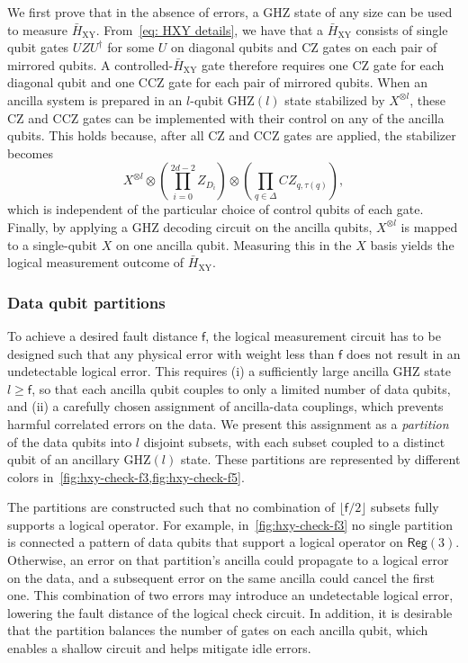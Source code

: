 \documentclass[%
    aps, 
    physrev,
    reprint,
]{revtex4-2}
\newcommand{\reg}[1]{\mathsf{Reg}(#1)}
\newcommand{\GHZ}[1]{\text{GHZ}(#1)}
\newcommand{\XY}{_\mathrm{XY}}
\newcommand{\dg}{^\dagger}
\begin{document}
We first prove that in the absence of errors, a GHZ state of any size can be used to measure $\bar{H}\XY$. 
From~\cref{eq: HXY details}, we have that a $\bar{H}\XY$ consists of single qubit gates $UZU\dg$ for some $U$ on diagonal qubits and CZ gates on each pair of mirrored qubits. 
A controlled-$\bar{H}\XY$ gate therefore requires one CZ gate for each diagonal qubit and one CCZ gate for each pair of mirrored qubits. When an ancilla system is prepared in an $l$-qubit  $\GHZ{l}$ state stabilized by $X^{\otimes l}$, these CZ and CCZ gates can be implemented with their control on any of the ancilla qubits. This holds because, after all CZ and CCZ gates are applied, the stabilizer becomes 
\begin{equation}
    X^{\otimes l} \otimes \left(\prod_{i=0}^{2d-2}Z_{D_i}\right) \otimes \left( \prod_{q\in\Delta}CZ_{q, \tau(q)} \right),
\end{equation}
which is independent of the particular choice of control qubits of each gate. Finally, by applying a GHZ decoding circuit on the ancilla qubits, $X^{\otimes l}$ is mapped to a single-qubit $X$ on one ancilla qubit. Measuring this in the $X$ basis yields the logical measurement outcome of $\bar{H}\XY$.

\subsubsection{Data qubit partitions}

To achieve a desired fault distance $\mathsf{f}$, the logical measurement circuit has to be designed such that any physical error with weight less than $\mathsf{f}$ does not result in an undetectable logical error. 
This requires (i) a sufficiently large ancilla GHZ state $l \geq \mathsf{f}$, so that each ancilla qubit couples to only a limited number of data qubits, and (ii) a carefully chosen assignment of ancilla-data couplings, which prevents harmful correlated errors on the data. 
We present this assignment as a \textit{partition} of the data qubits into $l$ disjoint subsets, with each subset coupled to a distinct qubit of an ancillary $\GHZ{l}$ state. 
These partitions are represented by different colors in~\cref{fig:hxy-check-f3,fig:hxy-check-f5}. 

The partitions are constructed such that no combination of $\lfloor \mathsf{f}/2 \rfloor$ subsets fully supports a logical operator. 
For example, in~\cref{fig:hxy-check-f3} no single partition is connected a pattern of data qubits that support a logical operator on $\reg3$.
Otherwise, an error on that partition's ancilla could propagate to a logical error on the data, and a subsequent error on the same ancilla could cancel the first one.
This combination of two errors 
may introduce an undetectable logical error, lowering the fault distance of the logical check circuit.
In addition, it is desirable that the partition balances the number of gates on each ancilla qubit, which enables a shallow circuit and helps mitigate idle errors. 
\end{document}
